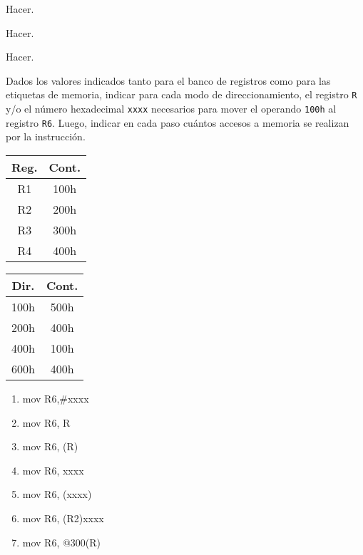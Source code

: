 \documentclass[12pt,a4paper]{article}
\begin{document}

 Hacer.

 Hacer.

 Hacer.

\newpage

 Dados los valores indicados tanto para el banco de registros como para las etiquetas de memoria, indicar para cada modo de direccionamiento, el registro \texttt{R} y/o el número hexadecimal \texttt{xxxx} necesarios para mover el operando \texttt{100h} al registro \texttt{R6}. Luego, indicar en cada paso cuántos accesos a memoria se realizan por la instrucción.
\begin{center}
	\begin{minipage}{0.17\textwidth}
		\begin{tabular}{|c|c|} \hline
			Reg. & Cont. \\\hline
			R1 & 100h \\\hline
			R2 & 200h \\\hline
			R3 & 300h \\\hline
			R4 & 400h \\\hline
		\end{tabular}
	\end{minipage}
	\begin{minipage}{0.17\textwidth}
		\begin{tabular}{|c|c|} \hline
			Dir. & Cont. \\\hline
			100h & 500h \\\hline
			200h & 400h \\\hline
			400h & 100h \\\hline
			600h & 400h \\\hline
		\end{tabular}
	\end{minipage}
	\begin{minipage}{0.3\textwidth}
		\begin{enumerate}[(1)]
			\itemsep -5pt
			\item mov R6,\#xxxx
			\item mov R6, R
			\item mov R6, (R)
			\item mov R6, xxxx
			\item mov R6, (xxxx)
			\item mov R6, (R2)xxxx
			\item mov R6, @300(R)
		\end{enumerate}
	\end{minipage}

\end{center}
\end{document}
